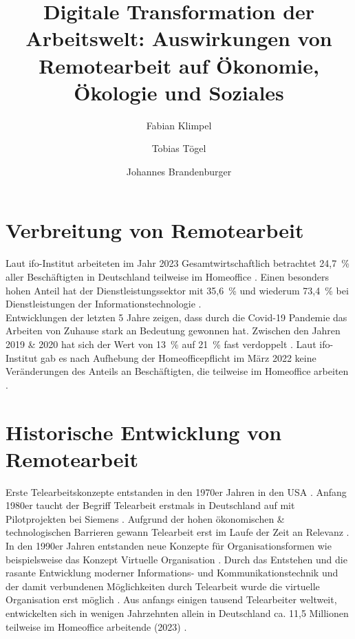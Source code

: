 \documentclass[runningheads]{llncs}
\begin{document}
\title{Digitale Transformation der Arbeitswelt: Auswirkungen von Remotearbeit auf Ökonomie, Ökologie und Soziales}


\author{Fabian Klimpel \and
Tobias Tögel \and
Johannes Brandenburger}
%


\maketitle

\section{Verbreitung von Remotearbeit}
Laut ifo-Institut arbeiteten im Jahr 2023 Gesamtwirtschaftlich betrachtet 24,7~\% aller Beschäftigten in Deutschland teilweise im Homeoffice \cite{ifo23}. Einen besonders hohen Anteil hat der Dienstleistungssektor mit 35,6~\%\cite{ifo23} und wiederum 73,4~\% bei Dienstleistungen der Informationstechnologie \cite{ifo23}.\\
Entwicklungen der letzten 5 Jahre zeigen, dass durch die Covid-19 Pandemie das Arbeiten von Zuhause stark an Bedeutung gewonnen hat. Zwischen den Jahren 2019 \& 2020 hat sich der Wert von 13~\% auf 21~\% fast verdoppelt \cite{statis23}. Laut ifo-Institut gab es nach Aufhebung der Homeofficepflicht im März 2022 keine Veränderungen des Anteils an Beschäftigten, die teilweise im Homeoffice arbeiten \cite{ifo23}.

\section{Historische Entwicklung von Remotearbeit}
Erste Telearbeitskonzepte entstanden in den 1970er Jahren in den USA \cite{Dangelmaier.1999}.
Anfang 1980er taucht der Begriff Telearbeit erstmals in Deutschland auf mit Pilot\-projekten bei Siemens \cite{Dangelmaier.1999}.
Aufgrund der hohen ökonomischen \& technologischen Barrieren gewann Telearbeit erst im Laufe der Zeit an Relevanz \cite{Dangelmaier.1999}.\\
In den 1990er Jahren entstanden neue Konzepte für Organisationsformen wie beispielsweise das Konzept \glqq{}Virtuelle Organisation\grqq{} \cite{Siedenbiedel.2020}.
Durch das Entstehen und die rasante Entwicklung moderner Informations- und Kommunikationstechnik und der damit verbundenen Möglichkeiten durch Telearbeit wurde die virtuelle Organisation erst möglich \cite{Siedenbiedel.2020}.
Aus anfangs einigen tausend Telearbeiter weltweit, entwickelten sich in wenigen Jahrzehnten allein in Deutschland ca. 11,5 Millionen teilweise im Homeoffice arbeitende (2023) \cite{statis24, ifo23}.
\end{document}
